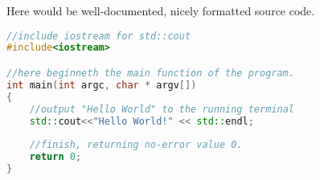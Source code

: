 
Here would be well-documented, nicely formatted source code.


\begin{lstlisting}[language={C++}, label={Hello World.}, frame = single ]
//include iostream for std::cout
#include<iostream>

//here beginneth the main function of the program.
int main(int argc, char * argv[])
{
	//output "Hello World" to the running terminal
	std::cout<<"Hello World!" << std::endl;
	
	//finish, returning no-error value 0.
	return 0;
}
\end{lstlisting}